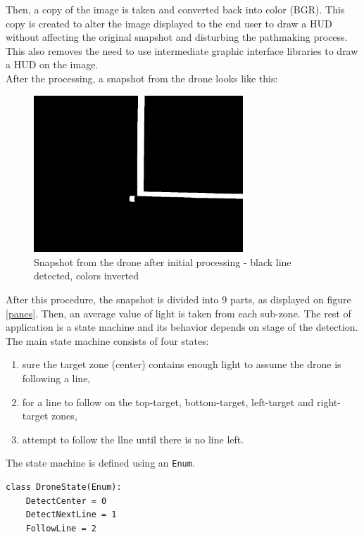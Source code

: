 \documentclass[english,10pt,a4paper,titlepage]{article}
\begin{document}
	Then, a copy of the image is taken and converted back into color (BGR). This copy is created to alter the image displayed to the end user to draw a HUD without affecting the original snapshot and disturbing the pathmaking process. This also removes the need to use intermediate graphic interface libraries to draw a HUD on the image. \\
	
	After the processing, a snapshot from the drone looks like this:
	
	\begin{figure}[h]
		\includegraphics[width=0.7\textwidth]{picture.jpg}
		\centering
		\caption{Snapshot from the drone after initial processing - black line detected, colors inverted}
	\end{figure} 
	
	After this procedure, the snapshot is divided into 9 parts, as displayed on  figure \ref{panes}. Then, an average value of light is taken from each sub-zone. The rest of application is a state machine and its behavior depends on stage of the detection. The main state machine consists of four states:
	\begin{enumerate}
		\item sure the target zone (center) contains enough light to assume the drone is following a line,
		\item for a line to follow on the top-target, bottom-target, left-target and right-target zones,
		\item attempt to follow the llne until there is no line left.	
	\end{enumerate}
	
	The state machine is defined using an \verb|Enum|.
	
	\begin{lstlisting}
class DroneState(Enum):
	DetectCenter = 0
	DetectNextLine = 1
	FollowLine = 2
\end{lstlisting}
\end{document}

